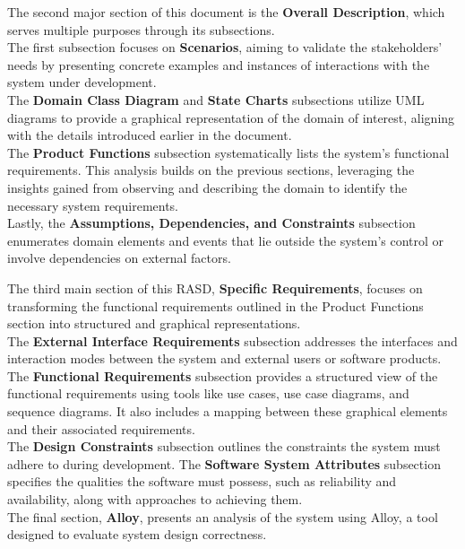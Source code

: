 The second major section of this document is the \textbf{Overall Description}, which serves multiple purposes through its subsections. \\
The first subsection focuses on \textbf{Scenarios}, aiming to validate the stakeholders’ needs by presenting concrete examples and instances of interactions with the system under development. \\
The \textbf{Domain Class Diagram} and \textbf{State Charts} subsections utilize UML diagrams to provide a graphical representation of the domain of interest, aligning with the details introduced earlier in the document. \\
The \textbf{Product Functions} subsection systematically lists the system's functional requirements. This analysis builds on the previous sections, leveraging the insights gained from observing and describing the domain to identify the necessary system requirements. \\
Lastly, the \textbf{Assumptions, Dependencies, and Constraints} subsection enumerates domain elements and events that lie outside the system’s control or involve dependencies on external factors.

The third main section of this RASD, \textbf{Specific Requirements}, focuses on transforming the functional requirements outlined in the Product Functions section into structured and graphical representations. \\
The \textbf{External Interface Requirements} subsection addresses the interfaces and interaction modes between the system and external users or software products. \\
The \textbf{Functional Requirements} subsection provides a structured view of the functional requirements using tools like use cases, use case diagrams, and sequence diagrams. It also includes a mapping between these graphical elements and their associated requirements. \\
The \textbf{Design Constraints} subsection outlines the constraints the system must adhere to during development. The \textbf{Software System Attributes} subsection specifies the qualities the software must possess, such as reliability and availability, along with approaches to achieving them. \\
The final section, \textbf{Alloy}, presents an analysis of the system using Alloy, a tool designed to evaluate system design correctness.